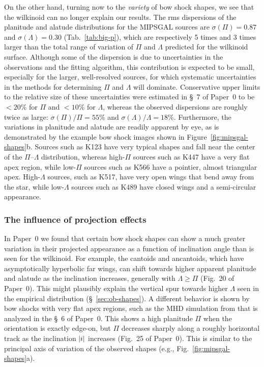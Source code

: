 On the other hand, turning now to the \emph{variety} of bow shock
shapes, we see that the wilkinoid can no longer explain our results.
The rms dispersions of the planitude and alatude distributions for the
MIPSGAL sources are \(\sigma(\Pi) = 0.87\) and
\(\sigma(\Lambda) = 0.30\) (Tab.~\ref{tab:big-p}), which are respectively 5 times
and 3 times larger than the total range of variation of \(\Pi\) and
\(\Lambda\) predicted for the wilkinoid surface.  Although some of the
dispersion is due to uncertainties in the observations and the fitting
algorithm, this contribution is expected to be small, especially for
the larger, well-resolved sources, for which systematic uncertainties
in the methods for determining \(\Pi\) and \(\Lambda\) will
dominate. Conservative upper limits to the relative size of these
uncertainties were estimated in \S~7 of Paper~0 to be \(< 20\%\) for
\(\Pi\) and \(< 10\%\) for \(\Lambda\), whereas the observed dispersions are
roughly twice as large: \(\sigma(\Pi)/\Pi = 55\%\) and
\(\sigma(\Lambda)/\Lambda = 18\%\).  Furthermore, the variations in planitude and
alatude are readily apparent by eye, as is demonstrated by the example
bow shock images shown in Figure~\ref{fig:mipsgal-shapes}b.  Sources
such as K123 have very typical shapes and fall near the center of the
\(\Pi\)--\(\Lambda\) distribution, whereas high-\(\Pi\) sources such as K447 have
a very flat apex region, while low-\(\Pi\) sources such as K566 have a
pointier, almost triangular apex.  High-\(\Lambda\) sources, such as K517,
have very open wings that bend away from the star, while
low-\(\Lambda\) sources such as K489 have closed wings and a semi-circular
appearance.

\subsubsection{The influence of projection effects}
\label{sec:infl-proj-effects}



In Paper~0 we found that certain bow shock shapes can show a much
greater variation in their projected appearance as a function of
inclination angle than is seen for the wilkinoid.  For example, the
cantoids and ancantoids, which have asymptotically hyperbolic far
wings, can shift towards higher apparent planitude and alatude as the
inclination increases, generally with \(\Lambda \ge \Pi\) (Fig.~20 of Paper~0).
This might plausibly explain the vertical spur towards higher
\(\Lambda\) seen in the empirical distribution (\S~\ref{sec:ob-shapes}). A
different behavior is shown by bow shocks with very flat apex regions,
such as the MHD simulation from \citet{Meyer:2017a} that is analyzed
in the \S~6 of Paper~0.  This shows a high planitude \(\Pi\) when the
orientation is exactly edge-on, but \(\Pi\) decreases sharply along a
roughly horizontal track as the inclination \(\lvert i\rvert\) increases
(Fig.~25 of Paper~0).  This is similar to the principal axis of
variation of the observed shapes (e.g.,
Fig.~\ref{fig:mipsgal-shapes}a).


